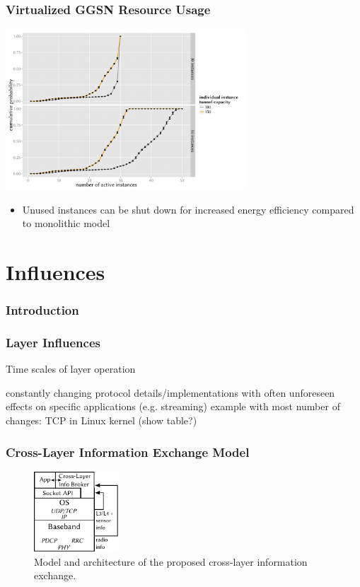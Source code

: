 \documentclass{beamer}
\begin{document}
\begin{frame}
	\frametitle{Virtualized GGSN Resource Usage}

	\begin{center}
		\includegraphics[height=6cm]{../../chapters/04-mobilenets/images/R-virtualized-instanceuse.pdf}
	\end{center}

	\begin{itemize}
		\item Unused instances can be shut down for increased energy efficiency compared to monolithic model
	\end{itemize}
\end{frame}



\section{Influences}

\begin{frame}
	\frametitle{Introduction}
\end{frame}

\begin{frame}
	\frametitle{Layer Influences}

	Time scales of layer operation

	constantly changing protocol details/implementations with often unforeseen effects on specific applications (e.g. streaming)
	example with most number of changes: TCP in Linux kernel (show table?)
\end{frame}

\begin{frame}
	\frametitle{Cross-Layer Information Exchange Model}

	\begin{figure}
		\centering
		\includegraphics[height=3cm]{../../chapters/05-mobilestreaming/images/cross-layer-model.pdf}
		\caption{Model and architecture of the proposed cross-layer information exchange.}
	\end{figure}
\end{frame}
\end{document}
